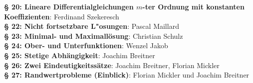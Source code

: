 \textbf{§ 20: Lineare Differentialgleichungen $m$-ter Ordnung mit konstanten Koeffizienten}: Ferdinand Szekeresch\\
\textbf{§ 22: Nicht fortsetzbare L"osungen}: Pascal Maillard\\
\textbf{§ 23: Minimal- und Maximallösung}: Christian Schulz\\
\textbf{§ 24: Ober- und Unterfunktionen}: Wenzel Jakob\\
\textbf{§ 25: Stetige Abhängigkeit}: Joachim Breitner\\
\textbf{§ 26: Zwei Eindeutigkeitssätze}: Joachim Breitner, Florian Mickler\\
\textbf{§ 27: Randwertprobleme (Einblick)}: Florian Mickler und Joachim Breitner\\
